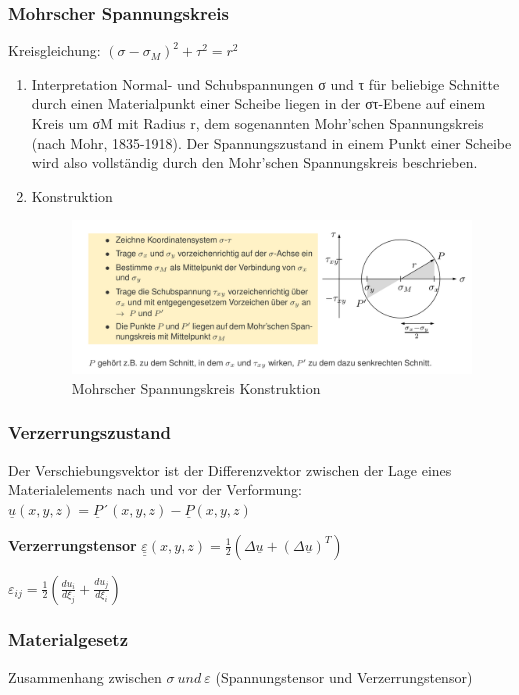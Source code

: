 \documentclass[11pt]{article}
\begin{document}
\subsubsection{Mohrscher Spannungskreis}
\label{sec:org12786f6}
Kreisgleichung: \((\sigma - \sigma_M)^2 + \tau^2 = r^2\)
\begin{enumerate}
\item Interpretation
\label{sec:org44d6498}
Normal- und Schubspannungen σ und τ für beliebige Schnitte durch einen Materialpunkt einer
Scheibe liegen in der στ-Ebene auf einem Kreis um σM mit Radius r, dem sogenannten
Mohr’schen Spannungskreis (nach Mohr, 1835-1918).
Der Spannungszustand in einem Punkt einer Scheibe wird also vollständig durch den Mohr’schen
Spannungskreis beschrieben.

\item Konstruktion
\label{sec:org87a3e0f}
\begin{figure}[htbp]
\centering
\includegraphics[width=.9\linewidth]{./img/mohrscher_spannungskreis_konstruktion.png}
\caption{Mohrscher Spannungskreis Konstruktion}
\end{figure}
\end{enumerate}

\subsubsection{Verzerrungszustand}
\label{sec:org955296d}
Der Verschiebungsvektor ist der Differenzvektor zwischen der Lage eines Materialelements nach und vor der Verformung:
\(\underline{u}(x,y,z) = \underline{P}´(x,y,z) - \underline{P}(x,y,z)\)

\textbf{Verzerrungstensor}
\(\underline{\underline{\varepsilon}}(x,y,z) = \frac{1}{2}(\Delta \underline{u} + (\Delta \underline{u})^T)\)

\(\varepsilon_{ij} = \frac{1}{2} (\frac{du_i}{d\xi_j} + \frac{du_j}{d\xi_i})\)

\subsubsection{Materialgesetz}
\label{sec:orgf337257}
Zusammenhang zwischen \(\sigma \ und \ \varepsilon\) (Spannungstensor und Verzerrungstensor)
\end{document}
